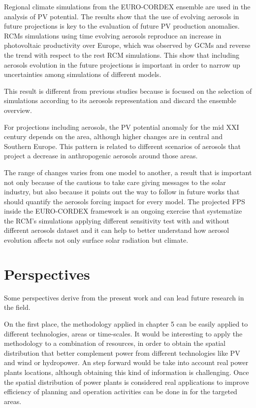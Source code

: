   Regional climate simulations from the EURO-CORDEX ensemble are used in the analysis of PV potential. The results show that the use of evolving aerosols in future projections is key to the evaluation of future PV production anomalies. RCMs simulations using time evolving aerosols reproduce an increase in photovoltaic productivity over Europe, which was observed by GCMs and reverse the trend with respect to the rest RCM simulations. This show that including aerosols evolution in the future projections is important in order to narrow up uncertainties among simulations of different models. 

  This result is different from previous studies because is focused on the selection of simulations according to its aerosols representation and discard the ensemble overview.
  
  For projections including aerosols, the PV potential anomaly for the mid XXI century depends on the area, although higher changes are in central and Southern Europe. This pattern is related to different scenarios of aerosols that project a decrease in anthropogenic aerosols around those areas.

  The range of changes varies from one model to another, a result that is important not only because of the cautious to take care giving messages to the solar industry, but also because it points out the way to follow in future works that should quantify the aerosols forcing impact for every model. The projected FPS inside the EURO-CORDEX framework is an ongoing exercise that systematize the RCM's simulations applying different sensitivity test with and without different aerosols dataset and it can help to better understand how aerosol evolution affects not only surface solar radiation but climate.

\chapter{Perspectives\label{perspectives}}

Some perspectives derive from the present work and can lead future research in the field.

On the first place, the methodology applied in chapter 5 can be easily applied to different technologies, areas or time-scales. It would be interesting to apply the methodology to a combination of resources, in order to obtain the spatial distribution that better complement power from different technologies like PV and wind or hydropower. An step forward would be take into account real power plants locations, although obtaining this kind of information is challenging. Once the spatial distribution of power plants is considered real applications to improve efficiency of planning and operation activities can be done in for the targeted areas.

